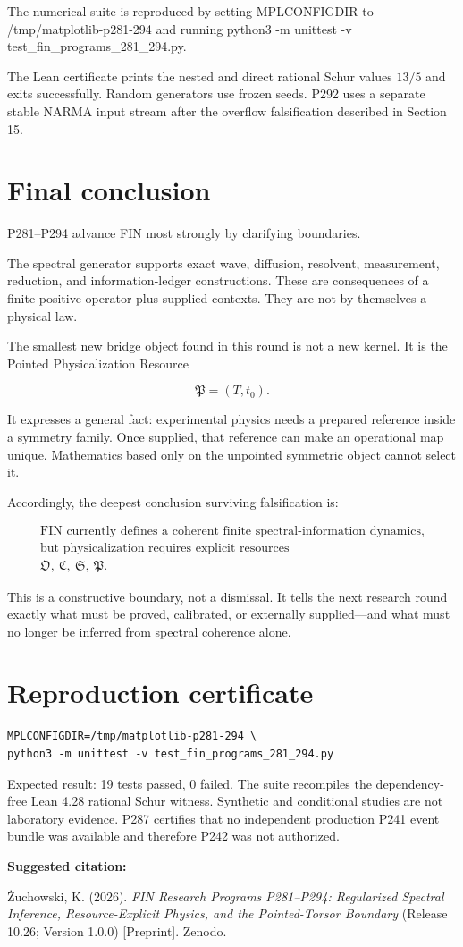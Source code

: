 \documentclass[11pt,a4paper,openany]{report}
\begin{document}
The numerical suite is reproduced by setting MPLCONFIGDIR to /\allowbreak{}tmp/\allowbreak{}matplotlib-p281-294 and running python3 -m unittest -v test\_fin\_programs\_281\_294.py.

The Lean certificate prints the nested and direct rational Schur values \(13/5\) and exits successfully. Random generators use frozen seeds. P292 uses a separate stable NARMA input stream after the overflow falsification described in Section 15.

\chapter{Final conclusion}

P281--P294 advance FIN most strongly by clarifying boundaries.

The spectral generator supports exact wave, diffusion, resolvent, measurement, reduction, and information-ledger constructions. These are consequences of a finite positive operator plus supplied contexts. They are not by themselves a physical law.

The smallest new bridge object found in this round is not a new kernel. It is the Pointed Physicalization Resource

\[
\mathfrak P=(T,t_0).
\]

It expresses a general fact: experimental physics needs a prepared reference inside a symmetry family. Once supplied, that reference can make an operational map unique. Mathematics based only on the unpointed symmetric object cannot select it.

Accordingly, the deepest conclusion surviving falsification is:

\[
\begin{gathered}
\text{FIN currently defines a coherent finite spectral-information dynamics,}\\
\text{but physicalization requires explicit resources}\\
\mathfrak O,\ \mathfrak C,\ \mathfrak S,\ \mathfrak P.
\end{gathered}
\]

This is a constructive boundary, not a dismissal. It tells the next research round exactly what must be proved, calibrated, or externally supplied---and what must no longer be inferred from spectral coherence alone.


\clearpage
\chapter*{Reproduction certificate}
\begin{Verbatim}[fontsize=\small]
MPLCONFIGDIR=/tmp/matplotlib-p281-294 \
python3 -m unittest -v test_fin_programs_281_294.py
\end{Verbatim}
Expected result: 19 tests passed, 0 failed. The suite recompiles the
dependency-free Lean 4.28 rational Schur witness. Synthetic and conditional
studies are not laboratory evidence. P287 certifies that no independent
production P241 event bundle was available and therefore P242 was not
authorized.

\medskip
\noindent\textbf{Suggested citation:}

\.Zuchowski, K. (2026). \emph{FIN Research Programs P281--P294:
Regularized Spectral Inference, Resource-Explicit Physics, and the
Pointed-Torsor Boundary} (Release 10.26; Version 1.0.0) [Preprint]. Zenodo.
\end{document}
